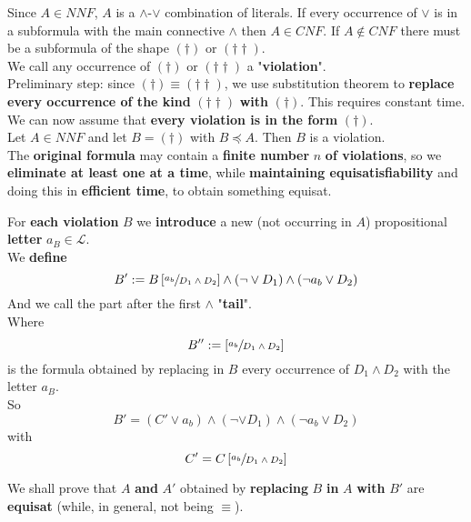 \documentclass[11pt]{article}
\begin{document}
	Since $A \in NNF$, $A$ is a $\wedge$-$\vee$ combination of literals. If every occurrence of $\vee$ is in a subformula with the main connective $\wedge$ then $A \in CNF$. If $A \notin CNF$ there must be a subformula of the shape $(\dag)$ or $(\dag \dag)$.\\
	
	We call any occurrence of $(\dag)$ or $(\dag \dag)$ a "\textbf{violation}".\\
	Preliminary step: since $(\dag) \equiv (\dag \dag)$, we use substitution theorem to \textbf{replace every occurrence of the kind} $(\dag \dag)$ \textbf{with} $(\dag)$. This requires constant time.\\
	
	We can now assume that \textbf{every violation is in the form} $(\dag)$.\\
	
	Let $A \in NNF$ and let $B = (\dag)$ with $B \preceq A$. Then $B$ is a violation.\\
	
	The \textbf{original formula} may contain a \textbf{finite number} $n$ \textbf{of violations}, so we \textbf{eliminate at least one at a time}, while \textbf{maintaining equisatisfiability} and doing this in \textbf{efficient time}, to obtain something equisat.\\
	
	\newpage
	
	For \textbf{each violation} $B$ we \textbf{introduce} a new (not occurring in $A$) propositional \textbf{letter} $a_B \in \mathcal{L}$.\\
	
	We \textbf{define }
	$$ B' := B \left[\sfrac{a_b}{D_1 \wedge D_2}\right] \wedge (\neg \vee D_1) \wedge (\neg a_b \vee D_2) $$
	And we call the part after the first $\wedge$ "\textbf{tail}".\\
	Where
	$$ B'' := \left[\sfrac{a_b}{D_1 \wedge D_2}\right] $$
	is the formula obtained by replacing in $B$ every occurrence of $D_1 \wedge D_2$ with the letter $a_B$.\\
	
	So 
	$$B' = (C' \vee a_b) \wedge (\neg \vee D_1) \wedge (\neg a_b \vee D_2) $$
	with 
	$$ C' = C \left[\sfrac{a_b}{D_1 \wedge D_2}\right] $$
	
	We shall prove that $A$ \textbf{and} $A'$ obtained by \textbf{replacing} $B$ \textbf{in} $A$ \textbf{with} $B'$ are \textbf{equisat} (while, in general, not being $\equiv$).\\
	
\end{document}
